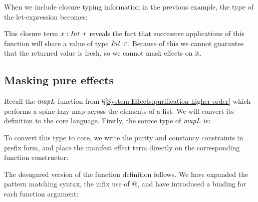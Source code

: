 When we include closure typing information in the previous example, the type of the let-expression becomes:


This closure term $x : \operatorname{\mathit{Int}} \ r$ reveals the fact that successive applications of this function will share a value of type $\operatorname{\mathit{Int}} \ r$. Because of this we cannot guarantee that the returned value is fresh, so we cannot mask effects on it.


\subsection{Masking pure effects}

Recall the $\operatorname{\mathit{mapL}}$ function from \S\ref{System:Effects:purification-higher-order} which performs a spine-lazy map across the elements of a list. We will convert its definition to the core language. Firstly, the source type of $\operatorname{\mathit{mapL}}$ is:


To convert this type to core, we write the purity and constancy constraints in prefix form, and place the manifest effect term directly on the corresponding function constructor:

\bigskip
{}

The desugared version of the function definition follows. We have expanded the pattern matching syntax, the infix use of $@$, and have introduced a binding for each function argument:



